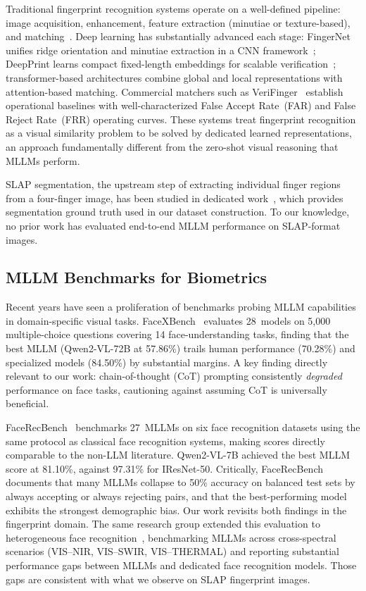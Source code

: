 \documentclass[journal]{IEEEtran}
\begin{document}
Traditional fingerprint recognition systems operate on a well-defined
pipeline: image acquisition, enhancement, feature extraction (minutiae
or texture-based), and matching~\cite{maltoni_handbook}.
Deep learning has substantially advanced each stage: FingerNet unifies
ridge orientation and minutiae extraction in a CNN framework~\cite{fingerNet};
DeepPrint learns compact fixed-length embeddings for scalable
verification~\cite{deepprint}; transformer-based architectures combine
global and local representations with attention-based matching.
Commercial matchers such as VeriFinger~\cite{verifinger} establish
operational baselines with well-characterized False Accept Rate~(FAR)
and False Reject Rate~(FRR) operating curves.
These systems treat fingerprint recognition as a visual similarity
problem to be solved by dedicated learned representations, an approach
fundamentally different from the zero-shot visual reasoning that MLLMs
perform.

SLAP segmentation, the upstream step of extracting individual finger
regions from a four-finger image, has been studied in dedicated
work~\cite{murshed2024SlapSeg}, which provides segmentation ground truth
used in our dataset construction.
To our knowledge, no prior work has evaluated end-to-end MLLM performance
on SLAP-format images.

\subsection{MLLM Benchmarks for Biometrics}

Recent years have seen a proliferation of benchmarks probing MLLM
capabilities in domain-specific visual tasks.
FaceXBench~\cite{facexbench2024} evaluates 28~models on 5,000
multiple-choice questions covering 14 face-understanding tasks, finding
that the best MLLM (Qwen2-VL-72B at 57.86\%) trails human performance
(70.28\%) and specialized models (84.50\%) by substantial margins.
A key finding directly relevant to our work: chain-of-thought
(CoT) prompting consistently \emph{degraded} performance on face tasks,
cautioning against assuming CoT is universally beneficial.

FaceRecBench~\cite{facerecbench2025} benchmarks 27~MLLMs on six face
recognition datasets using the same protocol as classical face recognition
systems, making scores directly comparable to the non-LLM literature.
Qwen2-VL-7B achieved the best MLLM score at 81.10\%, against 97.31\% for
IResNet-50.
Critically, FaceRecBench documents that many MLLMs collapse to 50\% accuracy
on balanced test sets by always accepting or always rejecting pairs, and
that the best-performing model exhibits the strongest demographic bias.
Our work revisits both findings in the fingerprint domain.
The same research group extended this evaluation to heterogeneous face
recognition~\cite{shahreza2026hfr}, benchmarking MLLMs across cross-spectral
scenarios (VIS--NIR, VIS--SWIR, VIS--THERMAL) and reporting substantial
performance gaps between MLLMs and dedicated face recognition models. Those
gaps are consistent with what we observe on SLAP fingerprint images.
\end{document}
